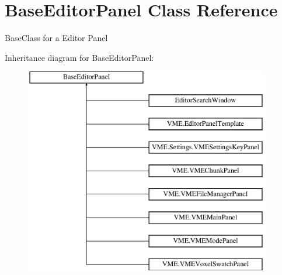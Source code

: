 \hypertarget{class_base_editor_panel}{}\section{Base\+Editor\+Panel Class Reference}
\label{class_base_editor_panel}


Base\+Class for a Editor Panel  


Inheritance diagram for Base\+Editor\+Panel\+:\begin{figure}[H]
\begin{center}
\leavevmode
\includegraphics[height=9.000000cm]{class_base_editor_panel}
\end{center}
\end{figure}
